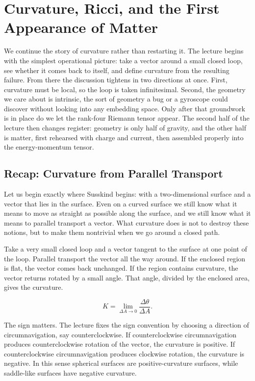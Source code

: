 \chapter{Curvature, Ricci, and the First Appearance of Matter}

We continue the story of curvature rather than restarting it. The lecture begins with the simplest operational picture: take a vector around a small closed loop, see whether it comes back to itself, and define curvature from the resulting failure. From there the discussion tightens in two directions at once. First, curvature must be local, so the loop is taken infinitesimal. Second, the geometry we care about is intrinsic, the sort of geometry a bug or a gyroscope could discover without looking into any embedding space. Only after that groundwork is in place do we let the rank-four Riemann tensor appear. The second half of the lecture then changes register: geometry is only half of gravity, and the other half is matter, first rehearsed with charge and current, then assembled properly into the energy-momentum tensor.

\section{Recap: Curvature from Parallel Transport}

Let us begin exactly where Susskind begins: with a two-dimensional surface and a vector that lies in the surface. Even on a curved surface we still know what it means to move as straight as possible along the surface, and we still know what it means to parallel transport a vector. What curvature does is not to destroy these notions, but to make them nontrivial when we go around a closed path.

Take a very small closed loop and a vector tangent to the surface at one point of the loop. Parallel transport the vector all the way around. If the enclosed region is flat, the vector comes back unchanged. If the region contains curvature, the vector returns rotated by a small angle. That angle, divided by the enclosed area, gives the curvature.

\begin{equation}
K=\lim_{\Delta A\to 0}\frac{\Delta\theta}{\Delta A}.
\end{equation}

The sign matters. The lecture fixes the sign convention by choosing a direction of circumnavigation, say counterclockwise. If counterclockwise circumnavigation produces counterclockwise rotation of the vector, the curvature is positive. If counterclockwise circumnavigation produces clockwise rotation, the curvature is negative. In this sense spherical surfaces are positive-curvature surfaces, while saddle-like surfaces have negative curvature.

